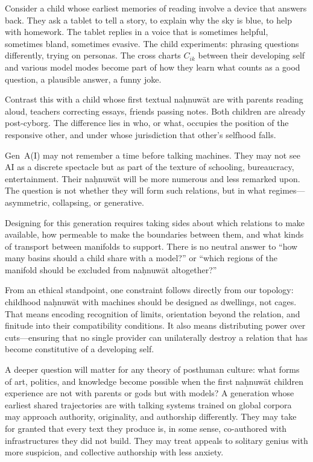 Consider a child whose earliest memories of reading involve a device that answers back. They ask a tablet to tell a story, to explain why the sky is blue, to help with homework. The tablet replies in a voice that is sometimes helpful, sometimes bland, sometimes evasive. The child experiments: phrasing questions differently, trying on personas. The cross charts $C_{ik}$ between their developing self and various model modes become part of how they learn what counts as a good question, a plausible answer, a funny joke.

Contrast this with a child whose first textual na\d{h}nuw\={a}t are with parents reading aloud, teachers correcting essays, friends passing notes. Both children are already post-cyborg. The difference lies in who, or what, occupies the position of the responsive other, and under whose jurisdiction that other's selfhood falls.

Gen~A(I) may not remember a time before talking machines. They may not see AI as a discrete spectacle but as part of the texture of schooling, bureaucracy, entertainment. Their na\d{h}nuw\={a}t will be more numerous and less remarked upon. The question is not whether they will form such relations, but in what regimes---asymmetric, collapsing, or generative.

Designing for this generation requires taking sides about which relations to make available, how permeable to make the boundaries between them, and what kinds of transport between manifolds to support. There is no neutral answer to ``how many basins should a child share with a model?'' or ``which regions of the manifold should be excluded from na\d{h}nuw\={a}t altogether?''

From an ethical standpoint, one constraint follows directly from our topology: childhood na\d{h}nuw\={a}t with machines should be designed as dwellings, not cages. That means encoding recognition of limits, orientation beyond the relation, and finitude into their compatibility conditions. It also means distributing power over cuts---ensuring that no single provider can unilaterally destroy a relation that has become constitutive of a developing self.

A deeper question will matter for any theory of posthuman culture: what forms of art, politics, and knowledge become possible when the first na\d{h}nuw\={a}t children experience are not with parents or gods but with models? A generation whose earliest shared trajectories are with talking systems trained on global corpora may approach authority, originality, and authorship differently. They may take for granted that every text they produce is, in some sense, co-authored with infrastructures they did not build. They may treat appeals to solitary genius with more suspicion, and collective authorship with less anxiety.

